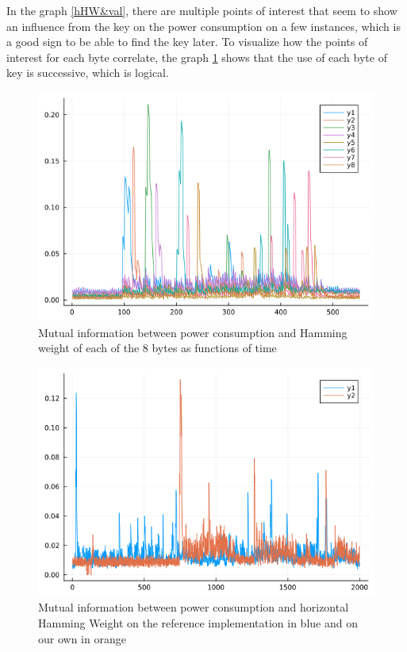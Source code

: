 \documentclass[a4paper,11pt,twocolumn]{article}
\begin{document}
	In the graph \ref{hHW&val}, there are multiple points of interest that seem to show an influence from the key on the power consumption on a few instances, which is a good sign to be able to find the key later. To visualize how the points of interest for each byte correlate, the graph \ref{hHW8_zoom} shows that the use of each byte of key is successive, which is logical. 
	
	\begin{figure}[h]
		\centering
		\includegraphics[scale=0.3]{hHW_8_bytes_zoom}
		\caption{Mutual information between power consumption and Hamming weight of each of the 8 bytes as functions of time}
		\label{hHW8_zoom}
	\end{figure}
	
	\begin{figure}[h]
		\centering
		\includegraphics[scale=0.3]{comp_ref_hHW}
		\caption{Mutual information between power consumption and horizontal Hamming Weight on the reference implementation in blue and on our own in orange}
		\label{compref}
	\end{figure}
	
\end{document}

